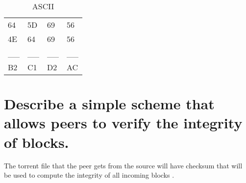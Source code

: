 \documentclass[10pt,a4paper]{article}
\begin{document}
\begin{table}[h]
\centering
\caption{ASCII}
\label{my-label}
\begin{tabular}{llll}
64   & 5D   & 69   & 56   \\
4E   & 64   & 69   & 56   \\
\_\_ & \_\_ & \_\_ & \_\_ \\
B2   & C1   & D2   & AC  
\end{tabular}
\end{table}

\section{Describe a simple scheme that allows peers to verify the integrity of blocks.}
The torrent file that the peer gets from the source will have checksum that will be used to compute the integrity of all incoming blocks .
\end{document}
